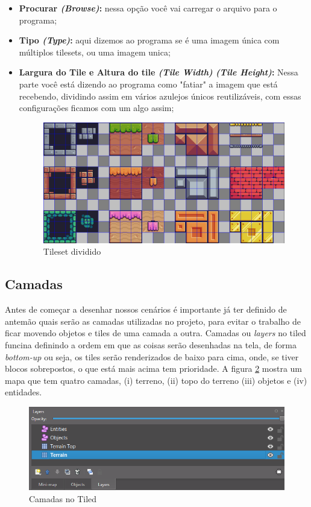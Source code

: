 \begin{itemize}
    \item \textbf{Procurar \textit{(Browse)}:} nessa opção você vai carregar o arquivo para o programa;
    \item \textbf{Tipo \textit{(Type)}:} aqui dizemos ao programa se é uma imagem única com múltiplos tilesets, ou uma imagem unica;
    \item \textbf{Largura do Tile e Altura do tile \textit{(Tile Width)} \textit{(Tile Height)}:} Nessa parte você está dizendo ao programa como "fatiar" a imagem que está recebendo, dividindo assim em vários azulejos únicos reutilizáveis, com essas configurações ficamos com um algo assim;
    \begin{figure}[h!]
        \centering
        \includegraphics[width=0.8\linewidth]{figuras/tileset-dividido.png}
        \caption{Tileset dividido}
        \label{fig:tileset-dividido}
    \end{figure}
\end{itemize}

\subsection{Camadas}
\label{sec:camadas}
Antes de começar a desenhar nossos cenários é importante já ter definido de antemão quais serão as camadas utilizadas no projeto, para evitar o trabalho de ficar movendo objetos e tiles de uma camada a outra. Camadas ou \textit{layers} no tiled funcina definindo a ordem em que as coisas serão desenhadas na tela, de forma \textit{bottom-up} ou seja, os tiles serão renderizados de baixo para cima, onde, se tiver blocos sobrepostos, o que está mais acima tem prioridade. A figura \ref{fig:layers} mostra um mapa que tem quatro camadas, (i) terreno, (ii) topo do terreno (iii) objetos e (iv) entidades. 
\begin{figure}[h!]
    \centering
    \includegraphics[width=1\linewidth]{figuras/layers.png}
    \caption{Camadas no Tiled}
    \label{fig:layers}
\end{figure}


